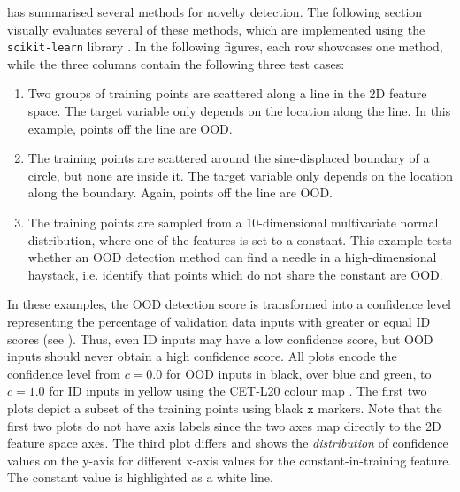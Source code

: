  has summarised several methods for novelty detection. The following section visually evaluates several of these methods, which are implemented using the \texttt{scikit-learn} library \cite{scikit-learn-2011}. In the following figures, each row showcases one method, while the three columns contain the following three test cases:
\begin{enumerate}
    \item Two groups of training points are scattered along a line in the 2D feature space. The target variable only depends on the location along the line. In this example, points off the line are OOD.
    \item The training points are scattered around the sine-displaced boundary of a circle, but none are inside it. The target variable only depends on the location along the boundary. Again, points off the line are OOD.
    \item The training points are sampled from a 10-dimensional multivariate normal distribution, where one of the features is set to a constant. This example tests whether an OOD detection method can find a needle in a high-dimensional haystack, i.e. identify that points which do not share the constant are OOD.
\end{enumerate}
In these examples, the OOD detection score is transformed into a confidence level representing the percentage of validation data inputs with greater or equal ID scores (see ). Thus, even ID inputs may have a low confidence score, but OOD inputs should never obtain a high confidence score. All plots encode the confidence level from $c = 0.0$ for OOD inputs in black, over blue and green, to $c = 1.0$ for ID inputs in yellow using the CET-L20 colour map \cite{color-cet-2015, color-cet-2023}. The first two plots depict a subset of the training points using black $\texttt{x}$ markers. Note that the first two plots do not have axis labels since the two axes map directly to the 2D feature space axes. The third plot differs and shows the \textit{distribution} of confidence values on the y-axis for different x-axis values for the constant-in-training feature. The constant value is highlighted as a white line.

